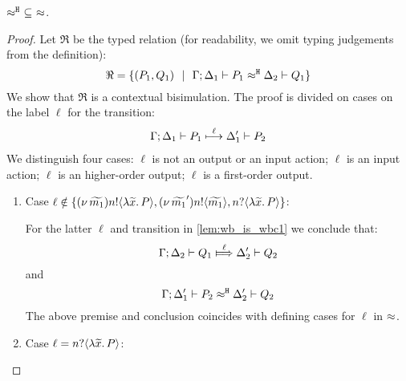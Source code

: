 
\begin{lemma}
	\label{app:lem:wb_is_wbc}
	$\approx^\mathtt{H}\ \subseteq\ \approx$.
\end{lemma}

\begin{proof}
	Let $\Re$ be the typed relation (for readability, we omit typing judgements from the definition):
	\[
		\Re = \{(P_1, Q_1) \ \ |\ \  \Gamma; \Delta_1 \vdash P_1 \approx^\mathtt{H} \Delta_2 \vdash Q_1\}
	\]
	We show that $\Re$ is a contextual bisimulation.
	The proof is divided on cases on the label $\ell$ for the transition:
%
	\begin{eqnarray}
		\Gamma; \Delta_1 \vdash P_1 \stackrel{\ell}{\longmapsto} \Delta_1' \vdash P_2
		\label{lem:wb_is_wbc1}
	\end{eqnarray}
%
We distinguish four cases: $\ell$ is not an output or an input action; $\ell$ is an input action;
$\ell$ is an higher-order output; $\ell$ is a first-order output.
	\begin{enumerate}
		\item
				Case $\ell \notin \{ (\nu\, \widetilde{m_1}) n ! \langle \lambda \widetilde{x}.\,P \rangle,  (\nu\, \widetilde{m_1}') n ! \langle \widetilde{m_1} \rangle, n ? \langle \lambda \widetilde{x}.\,P \rangle \}$:

				\noi For the latter $\ell$ and transition in \eqref{lem:wb_is_wbc1} we conclude that:	
				\[
					\horel{\Gamma}{\Delta_2}{Q_1}{\Hby{\ell}}{\Delta_2'}{Q_2}
				\]
				\noi and
				\[
					\Gamma; \Delta_1' \vdash P_2 \approx^\mathtt{H} \Delta_2' \vdash Q_2
				\]
				The above premise and conclusion coincides with defining cases for $\ell$ in $\approx$.

		\item	Case $\ell = n ? \langle \lambda \widetilde{x}.\,P \rangle$:


\end{enumerate}
\end{proof}
